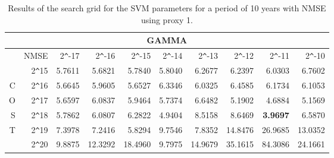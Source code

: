 \begin{table}[h!]
\centering
\begin{adjustbox}{width=\textwidth}
\begin{tabular}{|r|r|rrrrrrrr|}
\hline
\multicolumn{10}{|c|}{GAMMA} \tabularnewline
\hline
  &NMSE& 2\verb|^|-17 & 2\verb|^|-16 & 2\verb|^|-15 & 2\verb|^|-14 & 2\verb|^|-13 & 2\verb|^|-12 & 2\verb|^|-11 & 2\verb|^|-10 \\ 
  \hline
  &2\verb|^|15 & 5.7611 & 5.6821 & 5.7840 & 5.8040 & 6.2677 & 6.2397 & 6.0303 & 6.7602 \\ 
  C&2\verb|^|16 & 5.6645 & 5.9605 & 5.6527 & 6.3346 & 6.0325 & 6.4585 & 6.1734 & 6.1053 \\ 
  O&2\verb|^|17 & 5.6597 & 6.0837 & 5.9464 & 5.7374 & 6.6482 & 5.1902 & 4.6884 & 5.1569 \\ 
  S&2\verb|^|18 & 5.7862 & 6.0807 & 6.2822 & 4.9404 & 8.5158 & 8.6469 & \textbf{3.9697} & 6.5870 \\ 
  T&2\verb|^|19 & 7.3978 & 7.2416 & 5.8294 & 9.7546 & 7.8352 & 14.8476 & 26.9685 & 13.0352 \\ 
  &2\verb|^|20 & 9.8875 & 12.3292 & 18.4960 & 9.7975 & 14.9679 & 35.1615 & 84.3086 & 24.1661 \\ 
   \hline
\end{tabular}
\end{adjustbox}
\caption{Results of the search grid for the SVM parameters for a period of 10 years with NMSE using proxy 1.}
\end{table}